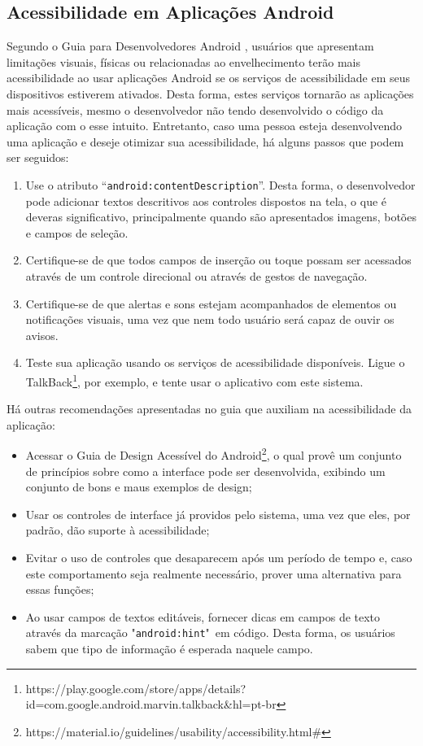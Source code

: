 
\subsection{Acessibilidade em Aplicações Android}

Segundo o Guia para Desenvolvedores Android \cite{DEVACCESS2016}, usuários que apresentam limitações visuais, físicas ou relacionadas ao envelhecimento terão mais acessibilidade ao usar aplicações Android se os serviços de acessibilidade em seus dispositivos estiverem ativados. Desta forma, estes serviços tornarão as aplicações mais acessíveis, mesmo o desenvolvedor não tendo desenvolvido o código da aplicação com o esse intuito. Entretanto, caso uma pessoa esteja desenvolvendo uma aplicação e deseje otimizar sua acessibilidade, há alguns passos que podem ser seguidos:
\begin{enumerate}
	\item Use o atributo “\texttt{android:contentDescription}”. Desta forma, o desenvolvedor pode adicionar textos descritivos aos controles dispostos na tela, o que é deveras significativo, principalmente quando são apresentados imagens, botões e campos de seleção.
	\item Certifique-se de que todos campos de inserção ou toque possam ser acessados através de um controle direcional ou através de gestos de navegação.
	\item Certifique-se de que alertas e sons estejam acompanhados de elementos ou notificações visuais, uma vez que nem todo usuário será capaz de ouvir os avisos.
	\item Teste sua aplicação usando os serviços de acessibilidade disponíveis. Ligue o TalkBack\footnote{https://play.google.com/store/apps/details?id=com.google.android.marvin.talkback\&hl=pt-br}, por exemplo, e tente usar o aplicativo com este sistema.
\end{enumerate}

Há outras recomendações apresentadas no guia que auxiliam na acessibilidade da aplicação:
\begin{itemize}
	\item Acessar o Guia de Design Acessível do Android\footnote{https://material.io/guidelines/usability/accessibility.html\#}, o qual provê um conjunto de princípios sobre como a interface pode ser desenvolvida, exibindo um conjunto de bons e maus exemplos de design;
	\item Usar os controles de interface já providos pelo sistema, uma vez que eles, por padrão, dão suporte à acessibilidade;
	\item Evitar o uso de controles que desaparecem após um período de tempo e, caso este comportamento seja realmente necessário, prover uma alternativa para essas funções;
	\item Ao usar campos de textos editáveis, fornecer dicas em campos de texto através da marcação "\texttt{android:hint}"\ em código. Desta forma, os usuários sabem que tipo de informação é esperada naquele campo.
\end{itemize}


